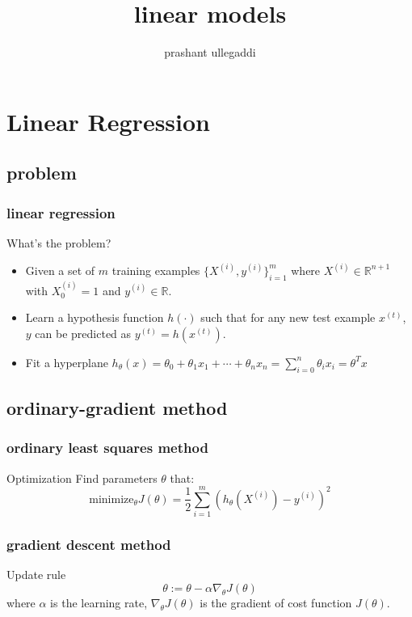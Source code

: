 \documentclass[11pt]{beamer}
\title{linear models}
\author[Prashant]{prashant ullegaddi}
\begin{document}
\begin{frame}
	\date{}
	\titlepage
\end{frame}


\section{Linear Regression}
\subsection{problem}
\begin{frame}
	\frametitle{\textbf{linear regression}}
	\begin{block}{What's the problem?}
	\begin{itemize}
		\item Given a set of $m$ training examples $\{X^{(i)}, y^{(i)}\}_{i=1}^m$ 
		where $X^{(i)} \in \mathbb{R}^{n+1}$
		with $X^{(i)}_0 = 1$ and $y^{(i)} \in \mathbb{R}$.
		\item Learn a hypothesis function $h(\cdot)$ such that for any new test example $x^{(t)}$, $y$ can be predicted as 
		$y^{(t)} = h(x^{(t)})$.
		\item Fit a hyperplane $h_\theta(x) = \theta_0 + \theta_1 x_1 + \cdots + \theta_n x_n = \sum_{i=0}^n \theta_i x_i = \theta^T x$
	\end{itemize}
	\end{block}
\end{frame}

\subsection{ordinary-gradient method}
\begin{frame}
	\frametitle{ordinary least squares method}
	\begin{block}{Optimization}
	Find parameters $\theta$ that:
	\begin{equation*}	
		\textrm{minimize}_\theta J(\theta) = \frac{1}{2} \sum_{i=1}^{m} (h_\theta (X^{(i)}) - y^{(i)})^2
	\end{equation*} 
   	\end{block}
\end{frame}

\begin{frame}
	\frametitle{gradient descent method}
	\begin{block}{Update rule}
     	\begin{equation*}
		\theta := \theta - \alpha \nabla_\theta J(\theta)
	\end{equation*}
	\indent where $\alpha$ is the learning rate, 
	$\nabla_\theta J(\theta)$ is the gradient of cost function $J(\theta)$.
   	\end{block}
\end{frame}
\end{document}
